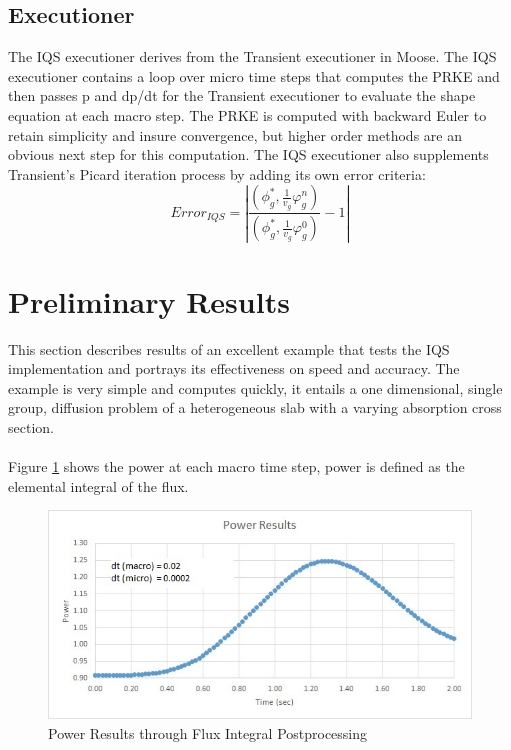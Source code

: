 \documentclass[12pt]{scrartcl}
\newcommand{\be}{\begin{equation}}
\newcommand{\ee}{\end{equation}}
\begin{document}
\subsection{Executioner}
The IQS executioner derives from the Transient executioner in Moose.  The IQS executioner contains a loop over micro time steps that computes the PRKE and then passes p and dp/dt for the Transient executioner to evaluate the shape equation at each macro step.  The PRKE is computed with backward Euler to retain simplicity and insure convergence, but higher order methods are an obvious next step for this computation.   The IQS executioner also supplements Transient’s Picard iteration process by adding its own error criteria: 
\be
Error_{IQS}=\left|\frac{\left(\phi^*_g,\frac{1}{v_g}\varphi_g^n\right)}{\left(\phi_g^*,\frac{1}{v_g}\varphi_g^0\right)}-1\right|
\ee

\section{Preliminary Results}
This section describes results of an excellent example that tests the IQS implementation and portrays its effectiveness on speed and accuracy.  The example is very simple and computes quickly, it entails a one dimensional, single group, diffusion problem of a heterogeneous slab with a varying absorption cross section.
\\ \\
Figure \ref{fig:power} shows the power at each macro time step, power is defined as the elemental integral of the flux.
\begin{figure}[h]
\includegraphics[width=\linewidth]{power_results.jpg}
\caption{Power Results through Flux Integral Postprocessing}
\label{fig:power}
\end{figure}
\end{document}
